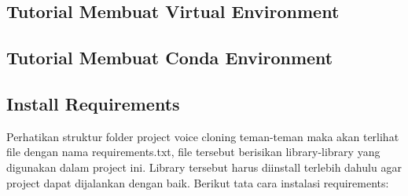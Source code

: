 \subsection{Tutorial Membuat Virtual Environment}

\subsection{Tutorial Membuat Conda Environment}

\subsection{Install Requirements}
Perhatikan struktur folder project voice cloning teman-teman maka akan terlihat file dengan nama requirements.txt, file tersebut berisikan library-library yang digunakan dalam project ini. Library tersebut harus diinstall terlebih dahulu agar project dapat dijalankan dengan baik. Berikut tata cara instalasi requirements:
